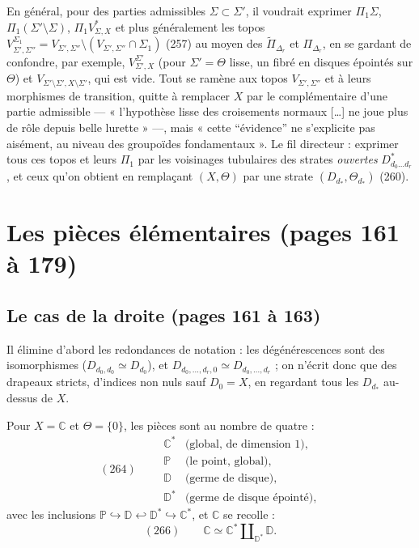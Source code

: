 \documentclass[11pt,a4paper]{article}
\begin{document}
En général, pour des parties admissibles $\Sigma \subset \Sigma'$, il voudrait
exprimer $\Pi_1 \Sigma$, $\Pi_1(\Sigma' \setminus \Sigma)$, $\Pi_1 V^{*}_{\Sigma,X}$
et plus généralement les topos $V^{\Sigma_1}_{\Sigma', \Sigma''} = V_{\Sigma',
\Sigma''} \setminus (V_{\Sigma',\Sigma''} \cap \Sigma_1)$ (257) au moyen des
$\widetilde{\Pi}_{\Delta_r}$ et $\Pi_{\Delta_r}$, en se gardant de confondre, par
exemple, $V^{\Sigma'}_{\Sigma',X}$ (pour $\Sigma' = \Theta$ lisse, un fibré en
disques épointés sur $\Theta$) et $V_{\Sigma' \setminus \Sigma', X \setminus
\Sigma'}$, qui est vide. Tout se ramène aux topos $V_{\Sigma', \Sigma''}$ et à leurs
morphismes de transition, quitte à remplacer $X$ par le complémentaire d'une
partie admissible — « l'hypothèse lisse des croisements normaux […] ne joue plus
de rôle depuis belle lurette » —, mais « cette “évidence” ne s'explicite pas
aisément, au niveau des groupoïdes fondamentaux ». Le fil directeur : exprimer tous
ces topos et leurs $\Pi_1$ par les voisinages tubulaires des strates
\emph{ouvertes} $D^{*}_{d_0 \dots d_r}$, et ceux qu'on obtient en remplaçant $(X,
\Theta)$ par une strate $(D_{d_*}, \Theta_{d_*})$ (260).

\section*{Les pièces élémentaires (pages 161 à 179)}

\subsection*{Le cas de la droite (pages 161 à 163)}

Il élimine d'abord les redondances de notation : les dégénérescences sont des
isomorphismes ($D_{d_0, d_0} \simeq D_{d_0}$), et $D_{d_0, \dots, d_r, 0} \simeq
D_{d_0, \dots, d_r}$ ; on n'écrit donc que des drapeaux stricts, d'indices non nuls
sauf $D_0 = X$, en regardant tous les $D_{d_*}$ au-dessus de $X$.

Pour $X = \mathbb{C}$ et $\Theta = \{0\}$, les pièces sont au nombre de quatre :
\[
(264) \qquad
\begin{array}{ll}
\mathbb{C}^* & \text{(global, de dimension 1)}, \\
\mathbb{P} & \text{(le point, global)}, \\
\mathbb{D} & \text{(germe de disque)}, \\
\mathbb{D}^* & \text{(germe de disque épointé)},
\end{array}
\]
avec les inclusions $\mathbb{P} \hookrightarrow \mathbb{D} \hookleftarrow
\mathbb{D}^* \hookrightarrow \mathbb{C}^*$, et $\mathbb{C}$ se recolle :
\[
(266) \qquad \mathbb{C} \simeq \mathbb{C}^* \amalg_{\mathbb{D}^*} \mathbb{D} .
\]
\end{document}
